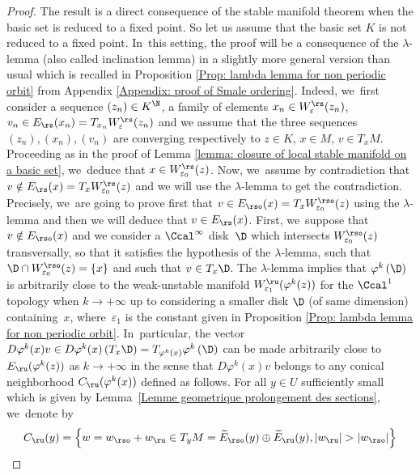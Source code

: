 \Changel
\begin{proof}
The result is a direct consequence of the stable manifold theorem when the basic set is reduced to a fixed point. So let us assume that the basic set $K$ is not reduced to a fixed point. In~this setting, the proof will be a consequence of the $\lambda$-lemma (also called inclination lemma) in a slightly more general version than usual which is recalled in Proposition \ref{Prop: lambda lemma for non periodic orbit} from Appendix \ref{Appendix: proof of Smale ordering}. Indeed, we~first consider a sequence $(z_n) \in K^{\N}$, a family of elements $x_n \in W_{\varepsilon}^\rs (z_n)$, $v_n \in E_\rs (x_n) = T_{x_n} W_{\varepsilon}^\rs (z_n)$ and we assume that the three sequences $(z_n),(x_n),(v_n)$ are converging respectively to $z \in K$, $x \in M$, $v \in T_x M$. Proceeding as in the proof of Lemma \ref{lemma: closure of local stable manifold on a basic set}, we~deduce that $x \in W_{\varepsilon_0}^\rs (z)$. Now, we~assume by contradiction that $v \notin E_\rs (x) = T_x W_{\varepsilon_0}^\rs (z)$ and we will use the $\lambda$-lemma to get the contradiction. Precisely, we~are going to prove first that $v \in E_{\rso} (x) = T_x W_{\varepsilon_0}^{\rso} (z)$ using the $\lambda$-lemma and then we will deduce that $v \in E_\rs (x)$. First, we~suppose that $v \notin E_{\rso}(x)$ and we consider a $\Ccal^{\infty}$ disk~$\D$ which intersects $W_{\varepsilon_0}^{\rso} (z)$ transversally, so that it satisfies the hypothesis of the $\lambda$\nobreakdash-lemma, such that \hbox{$\D \cap W_{\varepsilon_0}^{\rso} (z) = \{x\}$} and such that $v \in T_x \D$. The $\lambda$-lemma implies that $\varphi^k \left(\D \right)$ is arbitrarily close to the weak-unstable manifold $W_{\varepsilon_1}^{\ru} (\varphi^k (z))$ for the $\Ccal^1$ topology when $k \to +\infty$ up to considering a smaller disk $\D$ (of same dimension) containing~$x$, where~$\varepsilon_1$ is the constant given in Proposition \ref{Prop: lambda lemma for non periodic orbit}. In~particular, the vector $D \varphi^k (x)v \in D \varphi^k (x) \left(T_x \D \right) = T_{\varphi^k (x)} \varphi^k \left(\D \right)$ can be made arbitrarily close to $E_{\ru} (\varphi^k (z))$ as $k \to + \infty$ in the sense that $D \varphi^k (x)v$ belongs to any conical neighborhood $C_{\ru} (\varphi^k (x))$ defined as follows. For all $y \in U$ sufficiently small which is given by Lemma~\ref{Lemme geometrique prolongement des sections}, we~denote by
\[
C_{\ru} (y) = \left\{w = w_{\rso} + w_{\ru} \in T_y M =\widetilde{E}_{\rso} (y) \oplus \widetilde{E}_{\ru} (y), |w_{\ru}| > |w_{\rso}| \right\}
\]
\end{proof}
